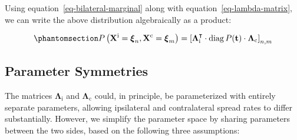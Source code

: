 \documentclass[
  sn-mathphys-num,
]{sn-jnl}
\begin{document}
Using equation~\ref{eq-bilateral-marginal} along with
equation~\ref{eq-lambda-matrix}, we can write the above distribution
algebraically as a product:

\begin{equation}\phantomsection\label{eq-bilateral-marginal-algebra}{
P \left( \mathbf{X}^\text{i} = \boldsymbol{\xi}_n, \mathbf{X}^\text{c} = \boldsymbol{\xi}_m \right) = \left[ \boldsymbol{\Lambda}^\intercal_\text{i} \cdot \operatorname{diag} P(\mathbf{t}) \cdot \boldsymbol{\Lambda}_\text{c} \right]_{n,m}
}\end{equation}

\subsection{Parameter Symmetries}\label{sec-params-symmetry}

The matrices \(\boldsymbol{\Lambda}_\text{i}\) and
\(\boldsymbol{\Lambda}_\text{c}\) could, in principle, be parameterized
with entirely separate parameters, allowing ipsilateral and
contralateral spread rates to differ substantially. However, we simplify
the parameter space by sharing parameters between the two sides, based
on the following three assumptions:
\end{document}
